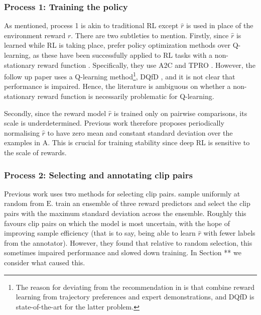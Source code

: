 \documentclass[11pt, a4paper, bibliography=totoc]{report}
\newcommand{\rp}{\hat{r}}
\newcommand{\expbuff}{\mathrm{E}}
\newcommand{\annbuff}{\mathrm{A}}
\begin{document}
\subsubsection{Process 1: Training the policy}
As mentioned, process 1 is akin to traditional RL except $ \rp $ is used in place of the environment reward $ r $. There are two subtleties to mention. Firstly, since $ \rp $ is learned while RL is taking place, \cite{Christiano2017} prefer policy optimization methods over Q-learning, as these have been successfully applied to RL tasks with a non-stationary reward function \cite{Ho2016}. Specifically, they use A2C \cite{Mnih2016} and TPRO \cite{Schulman2015}. However, the follow up paper \cite{Ibarz2018} uses a Q-learning method\footnote{The reason for deviating from the recommendation in \cite{Christiano2017} is that \cite{Ibarz2018} combine reward learning from trajectory preferences and expert demonstrations, and DQfD is state-of-the-art for the latter problem.}, DQfD \cite{Hester2017}, and it is not clear that performance is impaired. Hence, the literature is ambiguous on whether a non-stationary reward function is necessarily problematic for Q-learning. %

Secondly, since the reward model $ \rp $ is trained only on pairwise comparisons, its scale is underdetermined. Previous work therefore proposes periodically normalising $ \rp $ to have zero mean and constant standard deviation over the examples in $ \annbuff $. This is crucial for training stability since deep RL is sensitive to the scale of rewards. %

\subsubsection{Process 2: Selecting and annotating clip pairs}
Previous work uses two methods for selecting clip pairs. \cite{Ibarz2018} sample uniformly at random from $ \expbuff $. \cite{Christiano2017} train an ensemble of three reward predictors and select the clip pairs with the maximum standard deviation across the ensemble. Roughly this favours clip pairs on which the model is most uncertain, with the hope of improving sample efficiency (that is to say, being able to learn $ \rp $ with fewer labels from the annotator). However, they found that relative to random selection, this sometimes impaired performance and slowed down training. In Section ** we consider what caused this.
\end{document}
